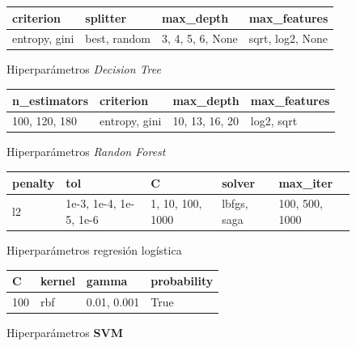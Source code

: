 			\begin{figure}[ht!]
				\centering
				\begin{tabular}{llll}
					\toprule
							criterion &        splitter &           max\_depth &      max\_features \\
					\midrule
					  entropy, gini &  best, random &  3, 4, 5, 6, None &  sqrt, log2, None \\
					\bottomrule
				\end{tabular}
				\caption{Hiperparámetros \emph{Decision Tree}}
				\label{table:8}
			\end{figure}
			
			\begin{figure}[ht!]
				\centering
				\begin{tabular}{llll}
					\toprule
					     n\_estimators &        criterion &          max\_depth &  max\_features \\
					\midrule
					  100, 120, 180 &  entropy, gini &  10,  13, 16, 20 &  log2, sqrt \\
					\bottomrule
				\end{tabular}
				\caption{Hiperparámetros \emph{Randon Forest}}
				\label{table:9}
			\end{figure}

			\begin{figure}[ht!]
				\centering
				\begin{tabular}{lllll}
					\toprule
					 penalty &                       tol &                   C &         solver &        max\_iter \\
					\midrule
					    l2 &  1e-3, 1e-4, 1e-5, 1e-6 &  1, 10, 100, 1000 &  lbfgs, saga &  100, 500, 1000 \\
					\bottomrule
				\end{tabular}
				\caption{Hiperparámetros regresión logística}
				\label{table:10}
			\end{figure}
			\newpage

			\begin{figure}[ht!]
				\centering
				\begin{tabular}{llll}
					\toprule
					      C & kernel &          gamma &  probability \\
					\midrule
					  100 &  rbf &  0.01, 0.001 &         True \\
					\bottomrule
				\end{tabular}
				\caption{Hiperparámetros \textbf{SVM}}
				\label{table:11}
			\end{figure}
